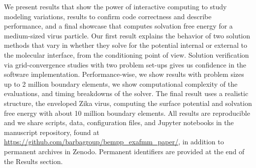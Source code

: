 We present results that show the power of interactive computing to study modeling variations, results to confirm code correctness and describe performance, and a final showcase that computes solvation free energy for a medium-sized virus particle.
Our first result explains the behavior of two solution methods that vary in whether they solve for the potential internal or external to the molecular interface, from the conditioning point of view.
Solution verification via grid-convergence studies with two problem set-ups gives us confidence in the software implementation.
Performance-wise, we show results with problem sizes up to 2 million boundary elements, we show computational complexity of the \fmm evaluations, and timing breakdowns of the solver.
The final result uses a realistic structure, the enveloped Zika virus, computing the surface potential and solvation free energy with about 10 million boundary elements.
All results are reproducible and we share scripts, data, configuration files, and Jupyter notebooks in the manuscript repository, found at \url{https://github.com/barbagroup/bempp_exafmm_paper/}, in addition to permanent archives in Zenodo.
Permanent identifiers are provided at the end of the Results section.
